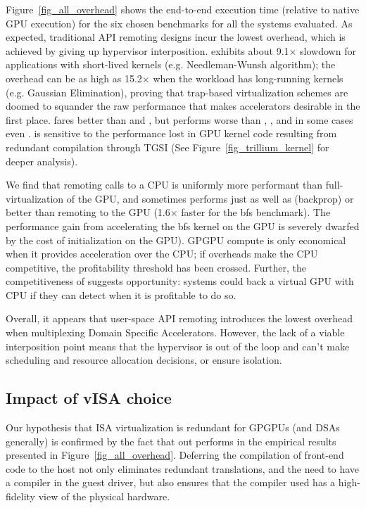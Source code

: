 Figure~\ref{fig_all_overhead} shows the end-to-end execution time (relative to
native GPU execution) for the six chosen benchmarks for all the systems
evaluated. As expected, traditional API remoting designs incur the lowest
overhead, which is achieved by giving up hypervisor interposition.
\gpuvmopt exhibits about 9.1$\times$ slowdown for applications with
short-lived kernels (e.g. Needleman-Wunsh algorithm); the overhead can be as
high as 15.2$\times$ when the workload has long-running kernels (e.g. Gaussian
Elimination), proving that trap-based virtualization schemes are doomed to
squander the raw performance that makes accelerators desirable in the first
place. \XenSVGA fares better than \gpuvmdef and \gpuvmopt, but performs worse
than \apigpu, \Trillium, and in some cases even \apicpu. \XenSVGA is sensitive
to the performance lost in GPU kernel code resulting from redundant
compilation through TGSI (See Figure~\ref{fig_trillium_kernel} for deeper
analysis).

We find that remoting calls to a CPU is uniformly more performant than
full-virtualization of the GPU, and sometimes performs just as well as
(backprop) or better than remoting to the GPU (1.6$\times$ faster for the bfs
benchmark). The performance gain from accelerating the bfs kernel on the GPU
is severely dwarfed by the cost of initialization on the GPU). GPGPU compute
is only economical when it provides acceleration over the CPU; if overheads
make the CPU competitive, the profitability threshold has been crossed.
Further, the competitiveness of \apicpu suggests opportunity: systems could
back a virtual GPU with CPU if they can detect when it is profitable to do so.

Overall, it appears that user-space API remoting introduces the lowest
overhead when multiplexing Domain Specific Accelerators. However, the lack of
a viable interposition point means that the hypervisor is out of the loop and
can't make scheduling and resource allocation decisions, or ensure isolation.

\subsection{Impact of vISA choice}

Our hypothesis that ISA virtualization is redundant for GPGPUs (and DSAs
generally) is confirmed by the fact that \Trillium out performs \XenSVGA in
the empirical results presented in Figure~\ref{fig_all_overhead}. Deferring
the compilation of front-end code to the host not only eliminates redundant
translations, and the need to have a compiler in the guest driver, but also
ensures that the compiler used has a high-fidelity view of the physical
hardware.

